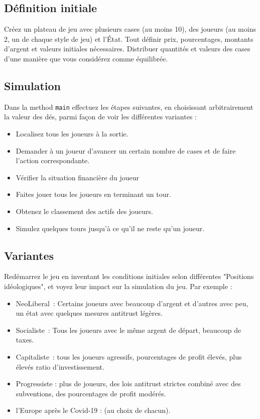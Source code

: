 \documentclass[12pt]{article}
\begin{document}
\subsection{Définition initiale}
Créez un plateau de jeu avec plusieurs cases (au moins 10), des joueurs (au moins 2, un de
chaque style de jeu) et l'État. Tout définir prix, pourcentages, montants d’argent et
valeurs initiales nécessaires. 
Distribuer quantités et valeurs des cases d'une manière que vous considérez comme équilibrée.

\subsection{Simulation}

 Dans la method \texttt{main} effectuez les étapes suivantes, en choisissant arbitrairement la valeur des dés, 
 parmi façon de voir les différentes variantes :
 \begin{itemize}
\item   Localisez tous les joueurs à la sortie.
\item    Demander à un joueur d'avancer un certain nombre de cases et de faire l'action correspondante.
\item    Vérifier la situation financière du joueur
\item    Faites jouer tous les joueurs en terminant un tour.
\item    Obtenez le classement des actifs des joueurs.
\item Simulez quelques tours jusqu'à ce qu'il ne reste qu'un joueur.
\end{itemize}


\subsection{Variantes}
Redémarrez le jeu en inventant les conditions initiales selon différentes
"Positions idéologiques", et voyez leur impact sur la simulation du jeu. Par
exemple :
\begin{itemize}
  \item NeoLiberal~: Certains joueurs avec beaucoup d'argent et d'autres avec peu, un état avec quelques
mesures antitrust légères.
  \item Socialiste~: Tous les joueurs avec le même argent de départ, beaucoup de taxes.
  \item Capitaliste~: tous les joueurs agressifs, pourcentages de profit élevés, plus élevés
ratio d'investissement.
  \item Progressiste : plus de joueurs, des lois antitrust strictes
combiné avec des subventions, des pourcentages de profit modérés.
  \item l'Europe après le Covid-19 : (au choix de chacun).
\end{itemize}
\end{document}
